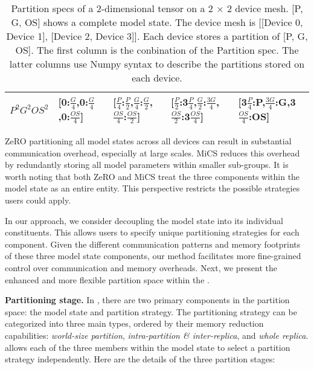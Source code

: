 \begin{table*}[]
\begin{tabular}{@{}lllll@{}}
$P^2G^2OS^2$ & {[}0:$\frac{G}{4}$,0:$\frac{G}{4}$,0:$\frac{OS}{4}${]} & {[}$\frac{P}{4}$:$\frac{P}{2}$,$\frac{G}{4}$:$\frac{G}{2}$,$\frac{OS}{4}$:$\frac{OS}{2}${]} & {[}$\frac{P}{2}$:3$\frac{P}{4}$,$\frac{G}{2}$:$\frac{3G}{4}$,$\frac{OS}{2}$:3$\frac{OS}{4}${]} & {[}3$\frac{P}{4}$:P,$\frac{3G}{4}$:G,3$\frac{OS}{4}$:OS{]} \\ \hline
\end{tabular}
\caption{Partition specs of a 2-dimensional tensor on a 2 × 2 device mesh. [P, G, OS] shows a complete model state. The device mesh is [[Device 0, Device 1], [Device 2, Device 3]]. Each device stores a partition of [P, G, OS]. The first column is the conbination of the Partition spec. The latter columns use Numpy syntax to describe the partitions stored on each device.}
\label{tab:spec}
\end{table*}


ZeRO partitioning all model states across all devices can result in substantial communication overhead, especially at large scales. 
MiCS reduces this overhead by redundantly storing all model parameters within smaller sub-groups.
It is worth noting that both ZeRO and MiCS treat the three components within the model state as an entire entity. This perspective restricts the possible strategies users could apply.


In our approach, we consider decoupling the model state into its individual constituents. This allows users to specify unique partitioning strategies for each component. 
Given the different communication patterns and memory footprints of these three model state components, our method facilitates more fine-grained control over communication and memory overheads. Next, we present the enhanced and more flexible partition space within the \SysName.

\noindent\textbf{Partitioning stage.} In \SysName, there are two primary components in the partition space: the model state and partition strategy. The partitioning strategy can be categorized into three main types, ordered by their memory reduction capabilities: \emph{world-size partition}, \emph{intra-partition \& inter-replica}, and \emph{whole replica}. 
\SysName allows each of the three members within the model state to select a partition strategy independently. Here are the details of the three partition stages:

